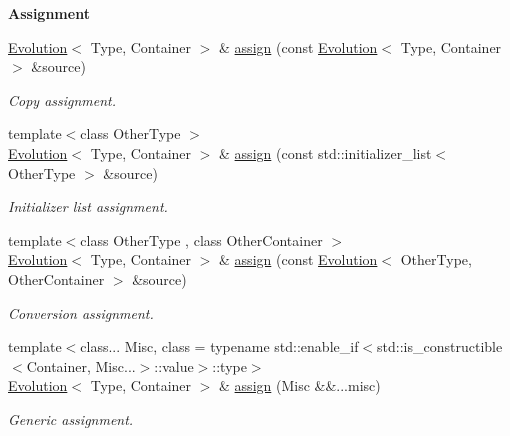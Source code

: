 \begin{Indent}{\bf Assignment}\par
\begin{DoxyCompactItemize}
\item 
\hyperlink{exceptionmagrathea_1_1Evolution}{Evolution}$<$ Type, Container $>$ \& \hyperlink{exceptionmagrathea_1_1Evolution_a6e3ade30089258c613200447324daf66}{assign} (const \hyperlink{exceptionmagrathea_1_1Evolution}{Evolution}$<$ Type, Container $>$ \&source)
\begin{DoxyCompactList}\small\item\em Copy assignment. \end{DoxyCompactList}\item 
{\footnotesize template$<$class Other\-Type $>$ }\\\hyperlink{exceptionmagrathea_1_1Evolution}{Evolution}$<$ Type, Container $>$ \& \hyperlink{exceptionmagrathea_1_1Evolution_a93af5bbd6ae1d693932f5f0f38c6b8d1}{assign} (const std\-::initializer\-\_\-list$<$ Other\-Type $>$ \&source)
\begin{DoxyCompactList}\small\item\em Initializer list assignment. \end{DoxyCompactList}\item 
{\footnotesize template$<$class Other\-Type , class Other\-Container $>$ }\\\hyperlink{exceptionmagrathea_1_1Evolution}{Evolution}$<$ Type, Container $>$ \& \hyperlink{exceptionmagrathea_1_1Evolution_af19b358b9ae10a973d8c614ac7ac2bad}{assign} (const \hyperlink{exceptionmagrathea_1_1Evolution}{Evolution}$<$ Other\-Type, Other\-Container $>$ \&source)
\begin{DoxyCompactList}\small\item\em Conversion assignment. \end{DoxyCompactList}\item 
{\footnotesize template$<$class... Misc, class  = typename std\-::enable\-\_\-if$<$std\-::is\-\_\-constructible$<$\-Container, Misc...$>$\-::value$>$\-::type$>$ }\\\hyperlink{exceptionmagrathea_1_1Evolution}{Evolution}$<$ Type, Container $>$ \& \hyperlink{exceptionmagrathea_1_1Evolution_a0824809960d748136e61bfe186dbddd3}{assign} (Misc \&\&...misc)
\begin{DoxyCompactList}\small\item\em Generic assignment. \end{DoxyCompactList}\end{DoxyCompactItemize}
\end{Indent}
